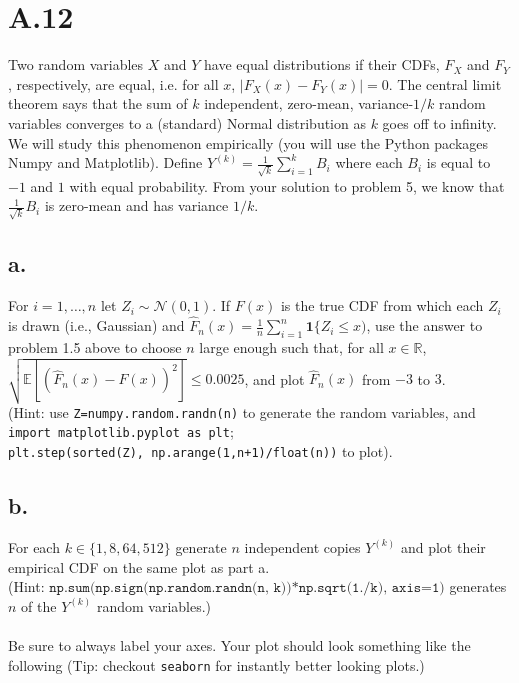 \documentclass{article}
\newcommand{\field}[1]{\mathbb{#1}}
\newcommand{\1}{\mathbf{1}}
\newcommand{\E}{\mathbb{E}}
\newcommand{\R}{\field{R}} %
\begin{document}
\section*{A.12}
{\Large 

Two random variables $X$ and $Y$ have equal
  distributions if their CDFs, $F_X$ and $F_Y$, respectively, are
  equal, i.e. for all $x$, $ |F_X(x) - F_Y(x)| = 0$. 
The central limit theorem says that the sum of $k$ independent,
zero-mean, variance-$1/k$ random variables converges to a (standard) Normal distribution as $k$ goes off to infinity.  
We will study this phenomenon empirically (you will use the Python packages Numpy and Matplotlib). 
Define $Y^{(k)} = \frac{1}{\sqrt{k}} \sum_{i=1}^k B_i$ where each $B_i$ is equal to $-1$ and $1$ with equal probability.
From your solution to problem 5, we know that $\frac{1}{\sqrt{k}} B_i$ is zero-mean and has variance $1/k$.

\subsection*{a.}
For $i=1,\dots,n$ let $Z_i \sim \mathcal{N}(0,1)$. If
  $F(x)$ is the true CDF from which each $Z_i$ is drawn (i.e.,
  Gaussian) and $\widehat{F}_n(x) = \frac{1}{n} \sum_{i=1}^n
  \1\{ Z_i \leq x)$, use the answer to problem 1.5  above to choose
  $n$ large enough such that, for all $x \in \R$, $ \sqrt{\E[
    (\widehat{F}_n(x)-F(x))^2 ]} \leq 0.0025$, and plot
  $\widehat{F}_n(x)$ from $-3$ to $3$. \\(Hint: use
  \texttt{Z=numpy.random.randn(n)} to generate the random
  variables, and \texttt{import matplotlib.pyplot as plt};\\
  \texttt{plt.step(sorted(Z), np.arange(1,n+1)/float(n))} to
  plot). 

\subsection*{b.}
For each $k \in \{1, 8, 64, 512\}$ generate $n$
  independent copies $Y^{(k)}$ and plot their empirical CDF on
  the same plot as part a.\\ (Hint: 
  $\texttt{np.sum(np.sign(np.random.randn(n,
    k))*np.sqrt(1./k), axis=1)}$ generates $n$ of the
  $Y^{(k)}$ random variables.) \\ \\ 

Be sure to always label your axes. 
Your plot should look something like the following (Tip: checkout \texttt{seaborn} for instantly better looking plots.)

}
\end{document}
